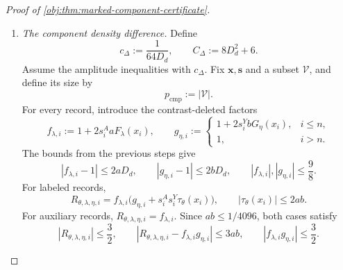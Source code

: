 \begin{proof}[Proof of \cref{obj:thm:marked-component-certificate}]
\begin{enumerate}
The sign flip
\[
\mathcal F_\eta(\lambda,\eta):=(\lambda,-\eta)
\]
is a bijection, and its weights satisfy
\[
w_{+1}(\lambda,\eta)=w_{-1}(\lambda,-\eta).
\]
Every auxiliary likelihood is unchanged by this flip, because it depends on \(\lambda\) alone. Reindexing the finite sum consequently gives
\[
g_{+1,\mathcal V}(\mathbf x,\mathbf s)
=
g_{-1,\mathcal V}(\mathbf x,\mathbf s)
\qquad
\text{if }\mathcal V\subseteq\{n+1,\ldots,N\}.
\]
If \(\mathcal V=\{i\}\) with \(i\le n\), singleton cancellation instead gives
\[
g_{+1,\{i\}}(\mathbf x,\mathbf s)
=
g_{-1,\{i\}}(\mathbf x,\mathbf s)=1.
\]
Thus we may take
\[
c_U:=c_S.
\]
Under its amplitude conditions, every auxiliary-only component and every singleton labeled component has equal densities under the two hypotheses. Equality for all spin assignments gives equality of their full conditional laws.

\item \textit{The component density difference.}
Define
\[
c_\Delta:=\frac1{64D_d},
\qquad
C_\Delta:=8D_d^2+6.
\]
Assume the amplitude inequalities with \(c_\Delta\). Fix \(\mathbf x,\mathbf s\) and a subset \(\mathcal V\), and define its size by
\[
p_{\mathrm{cmp}}:=|\mathcal V|.
\]
For every record, introduce the contrast-deleted factors
\[
f_{\lambda,i}:=1+2s_i^AaF_\lambda(x_i),
\qquad
g_{\eta,i}:=
\begin{cases}
1+2s_i^YbG_\eta(x_i),&i\le n,\\
1,&i>n.
\end{cases}
\]
The bounds from the previous steps give
\[
|f_{\lambda,i}-1|\le2aD_d,\qquad
|g_{\eta,i}-1|\le2bD_d,
\qquad
|f_{\lambda,i}|,|g_{\eta,i}|\le\frac98.
\]
For labeled records,
\[
R_{\theta,\lambda,\eta,i}
=f_{\lambda,i}
\bigl(g_{\eta,i}+s_i^As_i^Y\tau_\theta(x_i)\bigr),
\qquad
|\tau_\theta(x_i)|\le2ab.
\]
For auxiliary records, \(R_{\theta,\lambda,\eta,i}=f_{\lambda,i}\). Since \(ab\le1/4096\), both cases satisfy
\[
|R_{\theta,\lambda,\eta,i}|
\le\frac32,
\qquad
|R_{\theta,\lambda,\eta,i}-f_{\lambda,i}g_{\eta,i}|
\le3ab,
\qquad
|f_{\lambda,i}g_{\eta,i}|\le\frac32.
\]


\end{enumerate}
\end{proof}
